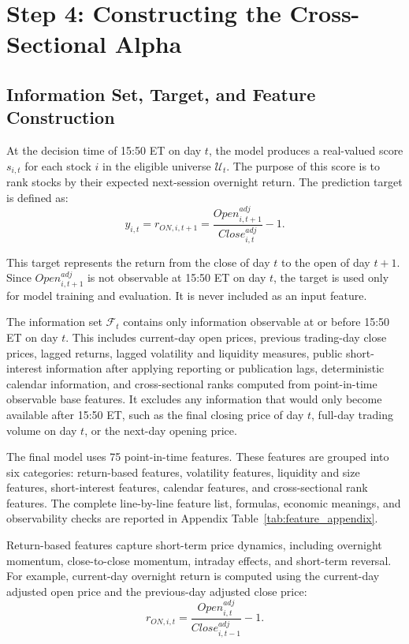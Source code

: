 \documentclass[12pt]{article}
\begin{document}
\section{Step 4: Constructing the Cross-Sectional Alpha}
\subsection{Information Set, Target, and Feature Construction}

At the decision time of 15:50 ET on day $t$, the model produces a real-valued score $s_{i,t}$ for each stock $i$ in the eligible universe $\mathcal{U}_t$. The purpose of this score is to rank stocks by their expected next-session overnight return. The prediction target is defined as:
\begin{equation}
    y_{i,t} = r_{ON,i,t+1} = \frac{Open^{adj}_{i,t+1}}{Close^{adj}_{i,t}} - 1 .
\end{equation}

This target represents the return from the close of day $t$ to the open of day $t+1$. Since $Open^{adj}_{i,t+1}$ is not observable at 15:50 ET on day $t$, the target is used only for model training and evaluation. It is never included as an input feature.

The information set $\mathcal{F}_t$ contains only information observable at or before 15:50 ET on day $t$. This includes current-day open prices, previous trading-day close prices, lagged returns, lagged volatility and liquidity measures, public short-interest information after applying reporting or publication lags, deterministic calendar information, and cross-sectional ranks computed from point-in-time observable base features. It excludes any information that would only become available after 15:50 ET, such as the final closing price of day $t$, full-day trading volume on day $t$, or the next-day opening price.

The final model uses 75 point-in-time features. These features are grouped into six categories: return-based features, volatility features, liquidity and size features, short-interest features, calendar features, and cross-sectional rank features. The complete line-by-line feature list, formulas, economic meanings, and observability checks are reported in Appendix Table~\ref{tab:feature_appendix}.

Return-based features capture short-term price dynamics, including overnight momentum, close-to-close momentum, intraday effects, and short-term reversal. For example, current-day overnight return is computed using the current-day adjusted open price and the previous-day adjusted close price:
\begin{equation}
    r_{ON,i,t} = \frac{Open^{adj}_{i,t}}{Close^{adj}_{i,t-1}} - 1 .
\end{equation}
\end{document}
